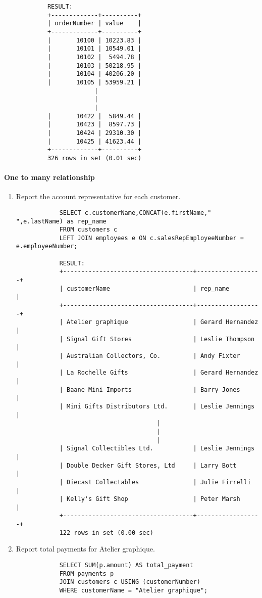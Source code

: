 \documentclass{article}
\begin{document}
\begin{enumerate}
\begin{verbatim}
			RESULT:
			+-------------+----------+
			| orderNumber | value    |
			+-------------+----------+
			|       10100 | 10223.83 |
			|       10101 | 10549.01 |
			|       10102 |  5494.78 |
			|       10103 | 50218.95 |
			|       10104 | 40206.20 |
			|       10105 | 53959.21 |
			             |
			             |
			             |
			|       10422 |  5849.44 |
			|       10423 |  8597.73 |
			|       10424 | 29310.30 |
			|       10425 | 41623.44 |
			+-------------+----------+
			326 rows in set (0.01 sec)
			\end{verbatim}
	\end{enumerate}
	\paragraph{One to many relationship}
	\begin{enumerate}
		\item Report the account representative for each customer.
			\begin{verbatim}
			SELECT c.customerName,CONCAT(e.firstName," ",e.lastName) as rep_name
			FROM customers c
			LEFT JOIN employees e ON c.salesRepEmployeeNumber = e.employeeNumber;
			
			RESULT:
			+------------------------------------+------------------+
			| customerName                       | rep_name         |
			+------------------------------------+------------------+
			| Atelier graphique                  | Gerard Hernandez |
			| Signal Gift Stores                 | Leslie Thompson  |
			| Australian Collectors, Co.         | Andy Fixter      |
			| La Rochelle Gifts                  | Gerard Hernandez |
			| Baane Mini Imports                 | Barry Jones      |
			| Mini Gifts Distributors Ltd.       | Leslie Jennings  |
			                           |
			                           |
			                           |
			| Signal Collectibles Ltd.           | Leslie Jennings  |
			| Double Decker Gift Stores, Ltd     | Larry Bott       |
			| Diecast Collectables               | Julie Firrelli   |
			| Kelly's Gift Shop                  | Peter Marsh      |
			+------------------------------------+------------------+
			122 rows in set (0.00 sec)
			\end{verbatim}
		\item Report total payments for Atelier graphique.
			\begin{verbatim}
			SELECT SUM(p.amount) AS total_payment
			FROM payments p
			JOIN customers c USING (customerNumber)
			WHERE customerName = "Atelier graphique";
			

\end{verbatim}
\end{enumerate}
\end{document}
